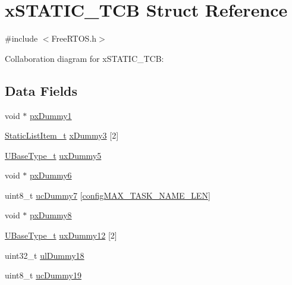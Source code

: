 \hypertarget{structx_s_t_a_t_i_c___t_c_b}{}\section{x\+S\+T\+A\+T\+I\+C\+\_\+\+T\+CB Struct Reference}
\label{structx_s_t_a_t_i_c___t_c_b}


{\ttfamily \#include $<$Free\+R\+T\+O\+S.\+h$>$}



Collaboration diagram for x\+S\+T\+A\+T\+I\+C\+\_\+\+T\+CB\+:
\subsection*{Data Fields}
\begin{DoxyCompactItemize}
\item 
void $\ast$ \hyperlink{structx_s_t_a_t_i_c___t_c_b_ae84725165c0efa82ef99b557ae6441a3}{px\+Dummy1}
\item 
\hyperlink{_free_r_t_o_s_8h_a1d31bc0472385a87424518da484d9e09}{Static\+List\+Item\+\_\+t} \hyperlink{structx_s_t_a_t_i_c___t_c_b_acbd968fbd6059e44009bb84bbc25cb1d}{x\+Dummy3} \mbox{[}2\mbox{]}
\item 
\hyperlink{portmacro_8h_a646f89d4298e4f5afd522202b11cb2e6}{U\+Base\+Type\+\_\+t} \hyperlink{structx_s_t_a_t_i_c___t_c_b_a0e266307381fece384ea3b4499e69b6f}{ux\+Dummy5}
\item 
void $\ast$ \hyperlink{structx_s_t_a_t_i_c___t_c_b_a76f9c413ec3b5c20c11afc867e5ed80e}{px\+Dummy6}
\item 
uint8\+\_\+t \hyperlink{structx_s_t_a_t_i_c___t_c_b_a53b726dadeaf28e49ae7c264d61cfc1d}{uc\+Dummy7} \mbox{[}\hyperlink{_free_r_t_o_s_config_8h_ac388dc4041aab6997348828eb27fc1a8}{config\+M\+A\+X\+\_\+\+T\+A\+S\+K\+\_\+\+N\+A\+M\+E\+\_\+\+L\+EN}\mbox{]}
\item 
void $\ast$ \hyperlink{structx_s_t_a_t_i_c___t_c_b_a68b3ac523fe33cfed8b4ccc3dfa91d8d}{px\+Dummy8}
\item 
\hyperlink{portmacro_8h_a646f89d4298e4f5afd522202b11cb2e6}{U\+Base\+Type\+\_\+t} \hyperlink{structx_s_t_a_t_i_c___t_c_b_af935d07fc6f57cf342c93a5ec39c002b}{ux\+Dummy12} \mbox{[}2\mbox{]}
\item 
uint32\+\_\+t \hyperlink{structx_s_t_a_t_i_c___t_c_b_a1ed5081a5e856f7e9a91cb576e392a04}{ul\+Dummy18}
\item 
uint8\+\_\+t \hyperlink{structx_s_t_a_t_i_c___t_c_b_a5140e0e79dcb02a51011a1aa4ef58876}{uc\+Dummy19}
\end{DoxyCompactItemize}


